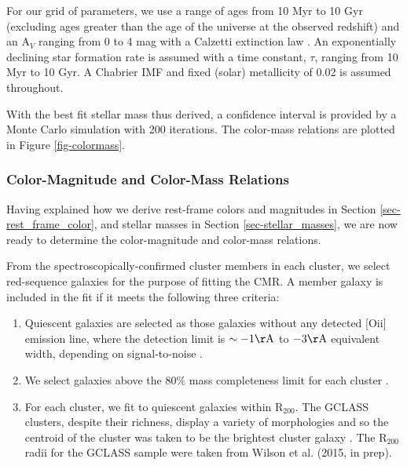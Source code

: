 For our grid of parameters, we use a range of ages from 10 Myr to 10 Gyr (excluding ages greater than the age of the universe at the observed redshift) and an A$_V$ ranging from 0 to 4 mag with a Calzetti extinction law \citep{Calzetti:2001hh}. An exponentially declining star formation rate is assumed with a time constant, $\tau$, ranging from 10 Myr to 10 Gyr. A Chabrier IMF \citep{chabrierimf} and fixed (solar) metallicity of 0.02 is assumed throughout.

With the best fit stellar mass thus derived, a confidence interval is provided by a Monte Carlo simulation with 200 iterations. The color-mass relations are plotted in Figure \ref{fig-colormass}.

\subsubsection{Color-Magnitude and Color-Mass Relations}\label{sec-fits}

Having explained how we derive rest-frame colors and magnitudes in Section \ref{sec-rest_frame_color}, and stellar masses in Section \ref{sec-stellar_masses}, we are now ready to determine the color-magnitude and color-mass relations.

From the spectroscopically-confirmed cluster members in each cluster, we select red-sequence galaxies for the purpose of fitting the CMR. A member galaxy is included in the fit if it meets the following three criteria:

\begin{enumerate}

\item
Quiescent galaxies are selected as those galaxies without any detected [O{\sc ii}] emission line, where the detection limit is $\sim -1 \mathrm{\AA}$ to $-3 \mathrm{\AA}$ equivalent width, depending on signal-to-noise \citep[see][]{Muzzin:2012dw}.

\item
We select galaxies above the $80\%$ mass completeness limit for each cluster \citep[calculated in][]{van-der-Burg:2013zn}.

\item
For each cluster, we fit to quiescent galaxies within R$_{200}$. The GCLASS clusters, despite their richness, display a variety of morphologies and so the centroid of the cluster was taken to be the brightest cluster galaxy \citep{Lidman:2012il}. The R$_{200}$ radii for the GCLASS sample were taken from Wilson et al. (2015, in prep).
\end{enumerate}

